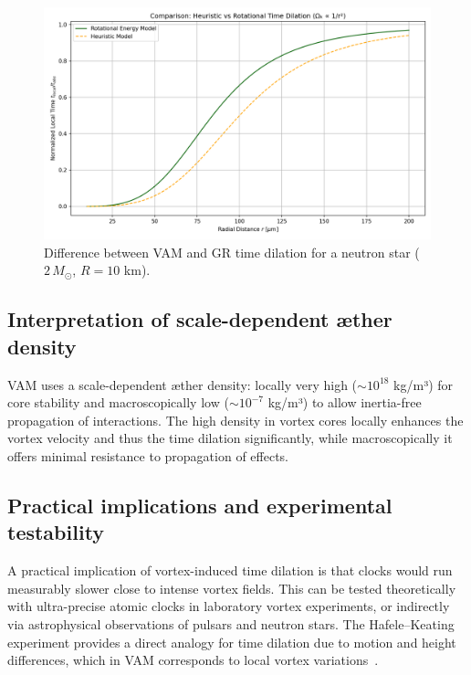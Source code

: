 \begin{figure}[ht!]
    \centering
    \includegraphics[width=0.7\linewidth]{RotationalVsHeuristicTimeDilation}
    \caption{Difference between VAM and GR time dilation for a neutron star ($2\,M_\odot$, $R=10$ km).}
    \label{fig:comparisonVAMGR}
\end{figure}

\subsection{Interpretation of scale-dependent æther density}

VAM uses a scale-dependent æther density: locally very high ($\sim10^{18}$ kg/m³) for core stability and macroscopically low ($\sim10^{-7}$ kg/m³) to allow inertia-free propagation of interactions. The high density in vortex cores locally enhances the vortex velocity and thus the time dilation significantly, while macroscopically it offers minimal resistance to propagation of effects.

\subsection{Practical implications and experimental testability}

A practical implication of vortex-induced time dilation is that clocks would run measurably slower close to intense vortex fields. This can be tested theoretically with ultra-precise atomic clocks in laboratory vortex experiments, or indirectly via astrophysical observations of pulsars and neutron stars. The Hafele–Keating experiment provides a direct analogy for time dilation due to motion and height differences, which in VAM corresponds to local vortex variations~\cite{hafele1972around}.
